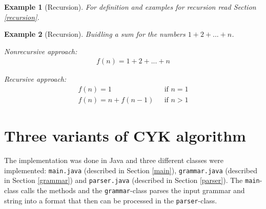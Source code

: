 \documentclass[a4paper, 11pt]{article}
\newtheorem*{example*}{Example}
\begin{document}
\begin{example*}[Recursion]

For definition and examples for recursion read Section \ref{recursion}.

\end{example*}


\begin{example*}[Recursion]
Buidling a sum for the numbers $1+2+...+n$.

Nonrecursive approach:
\begin{align*}
f(n) = 1+2+...+n
\end{align*}

Recursive approach:
\begin{align*}
f(n) = 1 \ \ \ \ \ \ \ \ \ \ \ \ \ \ \  & \ \ \ \text{if } n=1 \\
f(n) = n + f(n-1) & \ \ \ \text{if } n > 1
\end{align*}

\end{example*}












\pagebreak













\section{Three variants of CYK algorithm}
\label{systemdesign}

The implementation was done in Java and three different classes were implemented: \texttt{main.java} (described in Section \ref{main}), \texttt{grammar.java} (described in Section \ref{grammar}) and \texttt{parser.java} (described in Section \ref{parser}). The \texttt{main}-class calls the methods and the \texttt{grammar}-class parses the input grammar and string into a format that then can be processed in the \texttt{parser}-class.


\end{document}
